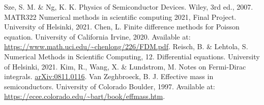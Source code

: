 \documentclass[10pt]{article}
\begin{document}
\newpage
\begin{thebibliography}{9}
 Sze, S. M. \& Ng, K. K. Physics of Semiconductor Devices. Wiley, 3rd ed., 2007.
   MATR322 Numerical methods in scientific computing 2021, Final Project. University of Helsinki, 2021.
 Chen, L. Finite difference methods for Poisson equation. University of California Irvine, 2020. Available at: \url{https://www.math.uci.edu/~chenlong/226/FDM.pdf}.
 Reisch, B. \& Lehtola, S. Numerical Methods in Scientific Computing, 12. Differential equations. University of Helsinki, 2021.
 Kim, R., Wang, X. \& Lundstrom, M. Notes on Fermi-Dirac integrals. \href{https://arxiv.org/abs/0811.0116}{arXiv:0811.0116}.
 Van Zeghbroeck, B. J. Effective mass in semiconductors. University of Colorado Boulder, 1997. Available at: \url{https://ecee.colorado.edu/~bart/book/effmass.htm}.
\end{thebibliography}
\end{document}

